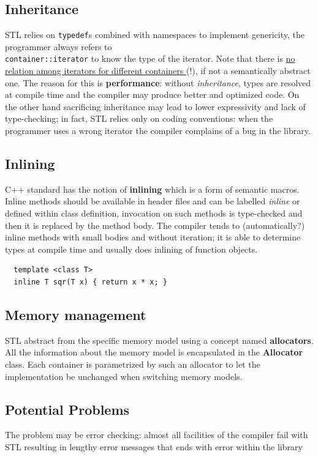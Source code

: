 \subsection{Inheritance}
STL relies on \lstinline|typedef|s combined with namespaces to
implement genericity, the programmer always refers to\\ \lstinline|container::iterator| to know the type of the iterator.
Note that there is \ul{no relation among iterators for different containers }(!), if not a semantically abstract one.
The reason for this is \textbf{performance}: 
without \textit{inheritance}, types are resolved at compile time and the compiler may produce better and optimized code.
On the other hand sacrificing inheritance may lead to
lower expressivity and lack of type-checking;
in fact, STL relies only on coding conventions:
when the programmer uses a wrong iterator the compiler complains of a bug in the library.

\subsection{Inlining}
C++ standard has the notion of \textbf{inlining} which is a form of semantic macros.
Inline methods should be available in header files
and can be labelled \textit{inline} or defined within class
definition, invocation on such methods is type-checked and then it is
replaced by the method body.
The compiler tends to (automatically?)
inline methods with small bodies and without iteration; 
it is able to determine types at compile
time and usually does inlining of function objects.

\lstset{language=C++}
\begin{lstlisting}
  template <class T>
  inline T sqr(T x) { return x * x; }
\end{lstlisting}

\lstset{style=javaBlockAnn}

\subsection{Memory management}
STL abstract from the specific memory model using a concept named \textbf{allocators}.
All the information about the memory model is
encapsulated in the \textbf{Allocator} class.
Each container is parametrized by such an allocator to let
the implementation be unchanged when switching
memory models.

\subsection{Potential Problems}
The problem may be error checking: 
almost all facilities of the compiler fail with STL resulting in lengthy error messages that ends with error within the library